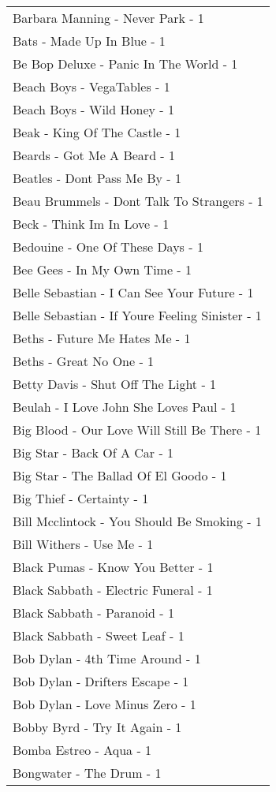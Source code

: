 \documentclass[
]{article}
\begin{document}
\begin{longtable}{l}
Barbara Manning - Never Park - 1 \\ 
Bats - Made Up In Blue - 1 \\ 
Be Bop Deluxe - Panic In The World - 1 \\ 
Beach Boys - VegaTables - 1 \\ 
Beach Boys - Wild Honey - 1 \\ 
Beak - King Of The Castle - 1 \\ 
Beards - Got Me A Beard - 1 \\ 
Beatles - Dont Pass Me By - 1 \\ 
Beau Brummels - Dont Talk To Strangers - 1 \\ 
Beck - Think Im In Love - 1 \\ 
Bedouine - One Of These Days - 1 \\ 
Bee Gees - In My Own Time - 1 \\ 
Belle Sebastian - I Can See Your Future - 1 \\ 
Belle Sebastian - If Youre Feeling Sinister - 1 \\ 
Beths - Future Me Hates Me - 1 \\ 
Beths - Great No One - 1 \\ 
Betty Davis - Shut Off The Light - 1 \\ 
Beulah - I Love John She Loves Paul - 1 \\ 
Big Blood - Our Love Will Still Be There - 1 \\ 
Big Star - Back Of A Car - 1 \\ 
Big Star - The Ballad Of El Goodo - 1 \\ 
Big Thief - Certainty - 1 \\ 
Bill Mcclintock - You Should Be Smoking - 1 \\ 
Bill Withers - Use Me - 1 \\ 
Black Pumas - Know You Better - 1 \\ 
Black Sabbath - Electric Funeral - 1 \\ 
Black Sabbath - Paranoid - 1 \\ 
Black Sabbath - Sweet Leaf - 1 \\ 
Bob Dylan - 4th Time Around - 1 \\ 
Bob Dylan - Drifters Escape - 1 \\ 
Bob Dylan - Love Minus Zero - 1 \\ 
Bobby Byrd - Try It Again - 1 \\ 
Bomba Estreo - Aqua - 1 \\ 
Bongwater - The Drum - 1 \\ 

\end{longtable}
\end{document}
